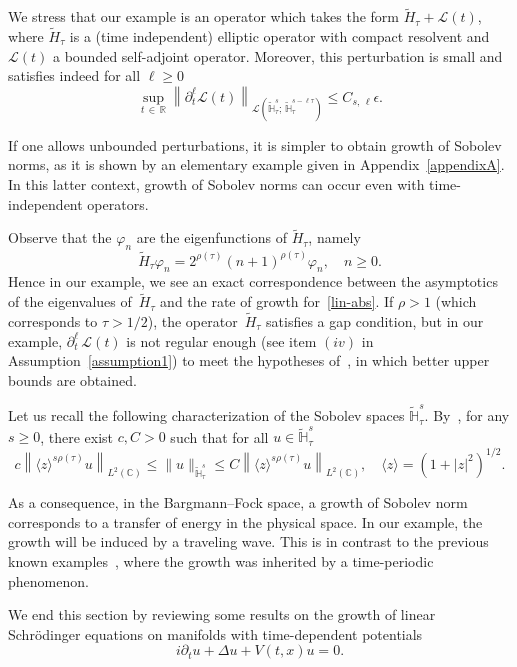 \documentclass[AHL,Unicode,published]{cedram}
\newcommand{\C}{\mathbb{C}}
\newcommand{\R}{\mathbb{R}}
\newcommand{\HH}{\mathbb{H}}
\newcommand{\clL}{\mathcal{L}}
\renewcommand{\L}{\mathscr{L}}
\newcommand*\eps{\epsilon}
\newcommand*\dis{\displaystyle}
\newcommand{\wt}{\widetilde}
\newcommand{\<}{\langle}
\renewcommand{\>}{\rangle}
\renewcommand{\phi}{\varphi}
\newcommand{\R}{\mathbb{R}}
\begin{document}
We stress that our example is an operator which takes the form $\wt{H}_\tau+\L(t)$, where $\wt{H}_\tau$ is a (time independent) elliptic operator with compact resolvent and $\L(t)$ a bounded self-adjoint operator. Moreover, this perturbation is small and satisfies indeed for all $\ell \geq 0$
\[
\dis \sup_{t\,\in\,\R}\left\| \partial^{\ell}_t\L(t)\right\|_{\clL\left(\widetilde{\HH}_\tau^{s};\,\widetilde{\HH}_\tau^{s- \ell \tau}\right)} \leq C_{s,\,\ell} \eps.
\]



If one allows unbounded perturbations, it is simpler to obtain growth of Sobolev norms, as it is shown by an elementary example given in Appendix~\ref{appendixA}. In this latter context, growth of Sobolev norms can occur even with time-independent operators.


Observe that the $\phi_n$ are the eigenfunctions of $\wt{H}_\tau$, namely
\[
\wt{H}_\tau\phi_n=2^{\rho(\tau)} (n+1)^{\rho(\tau) }\phi_n, \quad n\geq 0.
\]
Hence in our example, we see an exact correspondence between the asymptotics of the eigenvalues of~$\wt{H}_\tau$ and the rate of growth for~\eqref{lin-abs}. If $\rho>1$ (which corresponds to $\tau >1/2$), the operator~$\wt{H}_\tau$ satisfies a gap condition, but in our example, $\partial^{\ell}_t\,\L(t)$ is not regular enough (see item $(iv)$ in Assumption~\ref{assumption1}) to meet the hypotheses of~\cite[Theorems~1.8~and~1.9]{MasRo}, in which better upper bounds are obtained.



Let us recall the following characterization of the Sobolev spaces $\widetilde{\HH}_\tau^{s}$. By~\cite[Lemma~C.1]{GGT}, for any $s \geq 0$, there exist $c,C>0$ such that for all $u\in \wt{\HH}_\tau^s$
\[
c\left\|\<z\>^{s\rho(\tau)} u\right\|_{L^2(\C)} \leq \|u\|_{\wt{\HH}_\tau^s} \leq C\left\|\<z\>^{s\rho(\tau)} u\right\|_{L^2(\C)}, \quad \<z\>=\left(1+|z|^2\right)^{1/2}.
\]

As a consequence, in the Bargmann--Fock space, a growth of Sobolev norm corresponds to a transfer of energy in the physical space. In our example, the growth will be induced by a traveling wave. This is in contrast to the previous known examples~\cite{BGMR2,Delort2,Maspero}, where the growth was inherited by a time-periodic phenomenon.


We end this section by reviewing some results on the growth of linear Schr\"odinger equations on manifolds with time-dependent potentials
\begin{equation}\label{NLS}
i\partial_t u+\Delta u +V(t,x)u=0.
\end{equation}
\end{document}
